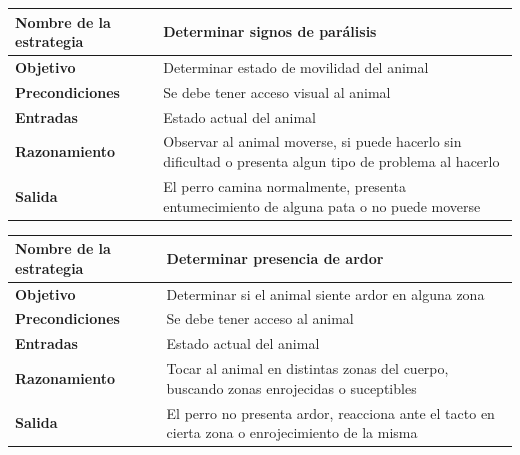 \documentclass[a4paper,table,xcdraw]{article}
\begin{document}
\begin{longtable}{|m{100pt}|m{300pt}|}
\hline
\textbf{Nombre de la estrategia} & Determinar signos de parálisis                                                                           \\ \hline
\endhead
%
\textbf{Objetivo}                & Determinar estado de movilidad del animal                                                                \\ \hline
\textbf{Precondiciones}          & Se debe tener acceso visual al animal                                                                    \\ \hline
\textbf{Entradas}                & Estado actual del animal                                                                                 \\ \hline
\textbf{Razonamiento}            & Observar al animal moverse, si puede hacerlo sin dificultad o presenta algun tipo de problema al hacerlo \\ \hline
\textbf{Salida}                  & El perro camina normalmente, presenta entumecimiento de alguna pata o no puede moverse                   \\ \hline
\end{longtable}

\begin{longtable}{|m{100pt}|m{300pt}|}
\hline
\textbf{Nombre de la estrategia} & Determinar presencia de ardor                                                                   \\ \hline
\endhead
%
\textbf{Objetivo}                & Determinar si el animal siente ardor en alguna zona                                             \\ \hline
\textbf{Precondiciones}          & Se debe tener acceso al animal                                                                  \\ \hline
\textbf{Entradas}                & Estado actual del animal                                                                        \\ \hline
\textbf{Razonamiento}            & Tocar al animal en distintas zonas del cuerpo, buscando zonas enrojecidas o suceptibles         \\ \hline
\textbf{Salida}                  & El perro no presenta ardor, reacciona ante el tacto en cierta zona o enrojecimiento de la misma \\ \hline
\end{longtable}
\end{document}
